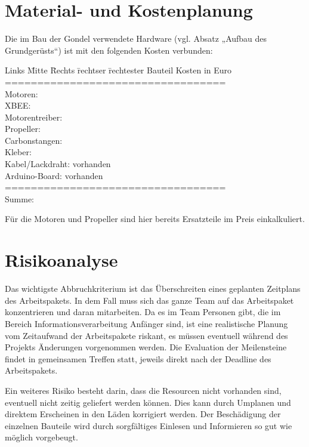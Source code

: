 \documentclass[lang=ngerman,inputenc=utf8,fontsize=10pt]{ldvarticle}
\begin{document}
\section{Material- und Kostenplanung}

Die im Bau der Gondel verwendete Hardware (vgl. Absatz „Aufbau des Grundgerüsts“) ist mit den folgenden Kosten verbunden:
\begin{tabbing}
Links \= Mitte \= Rechts \= rechtser \= rechtester \kill
Bauteil		\>\>\>\>		Kosten in Euro\\
==================================\\
Motoren:\>\>\>	\\
XBEE:	\>\>	\>\>		20\\
Motorentreiber:	\>\>\>\\
Propeller:		\>\>\>\>	4\\
Carbonstangen:	\>\>\>\\
Kleber:	\>\>	\>\>		5\\
Kabel/Lackdraht:\>\>\>\>	vorhanden\\
Arduino-Board:	\>\>\>\>	vorhanden\\
==================================\\
Summe:			\>\>\>5\\
\end{tabbing}
Für die Motoren und Propeller sind hier bereits Ersatzteile im Preis einkalkuliert. 

\section{Risikoanalyse}

Das wichtigste Abbruchkriterium ist das Überschreiten eines geplanten Zeitplans des Arbeitspakets. In dem Fall muss sich das ganze Team auf das Arbeitspaket konzentrieren und daran mitarbeiten. Da es im Team Personen gibt, die im Bereich Informationsverarbeitung Anfänger sind, ist eine realistische Planung vom Zeitaufwand der Arbeitspakete riskant, es müssen eventuell während des Projekts Änderungen vorgenommen werden. Die Evaluation der Meilensteine findet in gemeinsamen Treffen statt, jeweils direkt nach der Deadline des Arbeitspakets.


Ein weiteres Risiko besteht darin, dass die Resourcen nicht vorhanden sind, eventuell nicht zeitig geliefert werden können. Dies kann durch Umplanen und direktem Erscheinen in den Läden korrigiert werden. Der Beschädigung der einzelnen Bauteile wird durch sorgfältiges Einlesen und Informieren so gut wie möglich vorgebeugt.
\end{document}
